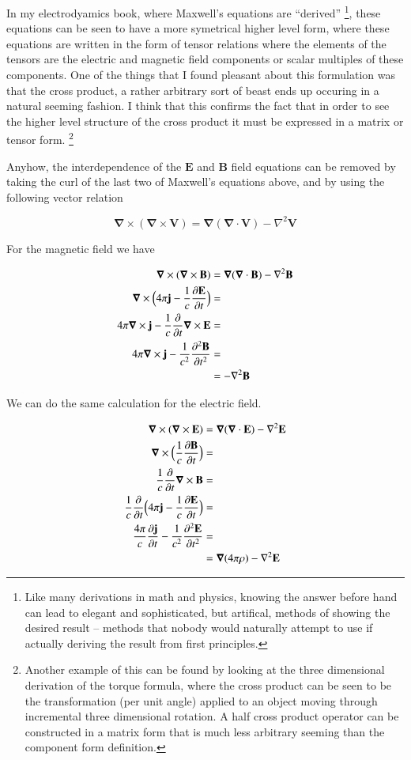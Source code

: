 \documentclass{article}      %
\newcommand{\grad}[0]{\boldsymbol{\nabla}}
\newcommand{\curl}[0]{\grad \times}
\newcommand{\diverg}[0]{\grad \cdot}
\newcommand{\delsquared}[0]{\nabla^2}
\newcommand{\D}[2] {\frac {\partial #2} {\partial #1}}
\newcommand{\Dsq}[2] {\frac {\partial^2 #2} {\partial {#1}^2}}
\newcommand{\Bj}[0]{\mathbf{j}}
\newcommand{\BB}[0]{\mathbf{B}}
\newcommand{\BE}[0]{\mathbf{E}}
\newcommand{\BV}[0]{\mathbf{V}}
\begin{document}
In my electrodyamics book, where Maxwell's equations are ``derived''
\footnote
{
Like many derivations in math and physics, knowing the answer before hand
can lead to elegant and sophisticated, but artifical, methods of showing the desired result --
methods that
nobody would naturally attempt to use if actually deriving the result from first principles.
},
these equations can be seen to have a more symetrical higher level form, where
these equations are written in the form of tensor relations where
the elements of the tensors are the electric and magnetic field components 
or scalar multiples of these components.  One of the things that I found 
pleasant about this formulation was that the cross product, a rather 
arbitrary sort of beast ends up occuring in a natural seeming fashion.  I 
think that this confirms the fact that in order to see the higher level 
structure of the cross product it must be expressed in a matrix or tensor form.
\footnote{
Another example of this can be found by looking at the three dimensional 
derivation of the torque formula, where the 
cross product can be seen to be the transformation (per unit angle)
applied to an object moving through incremental three dimensional 
rotation.  A half cross product operator can be constructed in a matrix form 
that is much less arbitrary seeming than the component form definition.
}

Anyhow, 
the interdependence of the $\BE$ and $\BB$ field equations can be removed by taking the
curl of the last two of Maxwell's equations above, and by using the following
vector relation

\begin{equation*}
\curl (\curl \BV) = \grad (\diverg \BV) - \delsquared \BV
\end{equation*}

For the magnetic field we have

\begin{align*}
\curl (\curl \BB) 			&= \grad (\diverg \BB) - \delsquared \BB \\
\curl \Bigl(4\pi\Bj - \frac{1}{c} \D{t}{\BE} \Bigr) 	&= \\
4\pi\curl \Bj - \frac{1}{c} \D{t}{} \curl \BE 	&= \\
4\pi\curl \Bj - \frac{1}{c^2} \Dsq{t}{\BB} &= \\
      	     				&= - \delsquared \BB
\end{align*}

We can do the same calculation for the electric field.

\begin{align*}
\curl (\curl \BE) &= \grad (\diverg \BE) - \delsquared \BE \\
\curl \Bigl(\frac{1}{c} \D{t}{\BB}\Bigr) &= \\
\frac{1}{c} \D{t}{} \curl \BB &= \\
\frac{1}{c} \D{t}{} \Bigl(4\pi \Bj - \frac{1}{c} \D{t}{\BE} \Bigr) &= \\
\frac{4\pi}{c} \D{t}{\Bj} - \frac{1}{c^2} \Dsq{t}{\BE} &= \\
             &= \grad (4\pi\rho) - \delsquared \BE \\
\end{align*}
\end{document}
